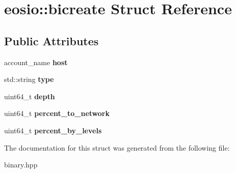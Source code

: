 \hypertarget{structeosio_1_1bicreate}{}\section{eosio\+:\+:bicreate Struct Reference}
\label{structeosio_1_1bicreate}
\subsection*{Public Attributes}
\begin{DoxyCompactItemize}
\item 
\mbox{\label{structeosio_1_1bicreate_a2ded512fcd4ecb867c1a92e86fda4d04}} 
account\+\_\+name {\bfseries host}
\item 
\mbox{\label{structeosio_1_1bicreate_ace001b091731d83258bae6ab46b0ebac}} 
std\+::string {\bfseries type}
\item 
\mbox{\label{structeosio_1_1bicreate_ae48e346bf80857be052c7c89841fa0ba}} 
uint64\+\_\+t {\bfseries depth}
\item 
\mbox{\label{structeosio_1_1bicreate_a8e5a964107c63125e5b772c49bcb6cba}} 
uint64\+\_\+t {\bfseries percent\+\_\+to\+\_\+network}
\item 
\mbox{\label{structeosio_1_1bicreate_a1dde620e80e5e68ef8ab2a8fcc4e4fc5}} 
uint64\+\_\+t {\bfseries percent\+\_\+by\+\_\+levels}
\end{DoxyCompactItemize}


The documentation for this struct was generated from the following file\+:\begin{DoxyCompactItemize}
\item 
binary.\+hpp\end{DoxyCompactItemize}
